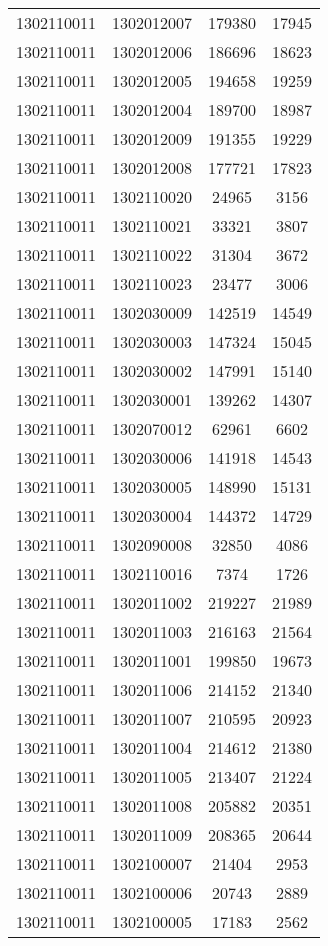 \begin{longtable}{llcc}
1302110011 & 1302012007 & 179380 & 17945\\
1302110011 & 1302012006 & 186696 & 18623\\
1302110011 & 1302012005 & 194658 & 19259\\
1302110011 & 1302012004 & 189700 & 18987\\
1302110011 & 1302012009 & 191355 & 19229\\
1302110011 & 1302012008 & 177721 & 17823\\
1302110011 & 1302110020 & 24965 & 3156\\
1302110011 & 1302110021 & 33321 & 3807\\
1302110011 & 1302110022 & 31304 & 3672\\
1302110011 & 1302110023 & 23477 & 3006\\
1302110011 & 1302030009 & 142519 & 14549\\
1302110011 & 1302030003 & 147324 & 15045\\
1302110011 & 1302030002 & 147991 & 15140\\
1302110011 & 1302030001 & 139262 & 14307\\
1302110011 & 1302070012 & 62961 & 6602\\
1302110011 & 1302030006 & 141918 & 14543\\
1302110011 & 1302030005 & 148990 & 15131\\
1302110011 & 1302030004 & 144372 & 14729\\
1302110011 & 1302090008 & 32850 & 4086\\
1302110011 & 1302110016 & 7374 & 1726\\
1302110011 & 1302011002 & 219227 & 21989\\
1302110011 & 1302011003 & 216163 & 21564\\
1302110011 & 1302011001 & 199850 & 19673\\
1302110011 & 1302011006 & 214152 & 21340\\
1302110011 & 1302011007 & 210595 & 20923\\
1302110011 & 1302011004 & 214612 & 21380\\
1302110011 & 1302011005 & 213407 & 21224\\
1302110011 & 1302011008 & 205882 & 20351\\
1302110011 & 1302011009 & 208365 & 20644\\
1302110011 & 1302100007 & 21404 & 2953\\
1302110011 & 1302100006 & 20743 & 2889\\
1302110011 & 1302100005 & 17183 & 2562\\

\end{longtable}
